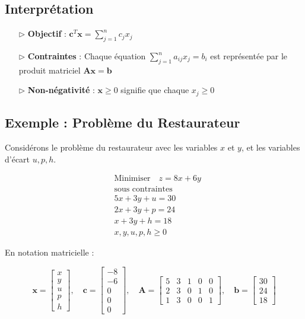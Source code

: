 \documentclass{report}
\begin{document}
\begin{multicols*}{2}
\subsection{Interprétation}

\begin{itemize}
    \item[$\rhd$] \textbf{Objectif} : \(\mathbf{c}^T \mathbf{x} = \sum_{j=1}^{n} c_j x_j\)
    \item[$\rhd$] \textbf{Contraintes} : Chaque équation \( \sum_{j=1}^{n} a_{ij} x_j = b_i \) est représentée par le produit matriciel \( \mathbf{A} \mathbf{x} = \mathbf{b} \)
    \item[$\rhd$] \textbf{Non-négativité} : \( \mathbf{x} \geq 0 \) signifie que chaque \( x_j \geq 0 \)
\end{itemize}

\subsection{Exemple : Problème du Restaurateur}

Considérons le problème du restaurateur avec les variables \( x \) et \( y \), et les variables d'écart \( u, p, h \).

\begin{align*}
& \text{Minimiser} \quad z = 8x + 6y \\
& \text{sous contraintes} \\
& 5x + 3y + u = 30 \\
& 2x + 3y + p = 24 \\
& x + 3y + h = 18 \\
& x, y, u, p, h \geq 0
\end{align*}

En notation matricielle :

\[
\mathbf{x} = 
\begin{bmatrix}
x \\ y \\ u \\ p \\ h
\end{bmatrix}, \quad
\mathbf{c} = 
\begin{bmatrix}
-8 \\ -6 \\ 0 \\ 0 \\ 0
\end{bmatrix}, \quad
\mathbf{A} = 
\begin{bmatrix}
5 & 3 & 1 & 0 & 0 \\
2 & 3 & 0 & 1 & 0 \\
1 & 3 & 0 & 0 & 1
\end{bmatrix}, \quad
\mathbf{b} = 
\begin{bmatrix}
30 \\ 24 \\ 18
\end{bmatrix}
\]


\end{multicols*}
\end{document}
